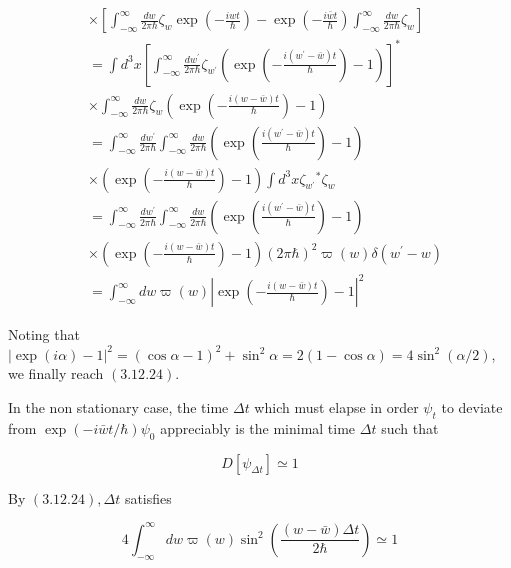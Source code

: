 \documentclass{article}
\begin{document}
 
\begin{align*}
& \times\left[\int_{-\infty}^{\infty} \frac{d w}{2 \pi \hbar} \zeta_{w} \exp \left(-\frac{i w t}{\hbar}\right)-\exp \left(-\frac{i \bar{w} t}{\hbar}\right) \int_{-\infty}^{\infty} \frac{d w}{2 \pi \hbar} \zeta_{w}\right] \\
& =\int d^{3} x\left[\int_{-\infty}^{\infty} \frac{d w^{\prime}}{2 \pi \hbar} \zeta_{w^{\prime}}\left(\exp \left(-\frac{i\left(w^{\prime}-\bar{w}\right) t}{\hbar}\right)-1\right)\right]^{*}  \tag{3.12.25}\\
& \times \int_{-\infty}^{\infty} \frac{d w}{2 \pi \hbar} \zeta_{w}\left(\exp \left(-\frac{i(w-\bar{w}) t}{\hbar}\right)-1\right) \\
& =\int_{-\infty}^{\infty} \frac{d w^{\prime}}{2 \pi \hbar} \int_{-\infty}^{\infty} \frac{d w}{2 \pi \hbar}\left(\exp \left(\frac{i\left(w^{\prime}-\bar{w}\right) t}{\hbar}\right)-1\right) \\
& \times\left(\exp \left(-\frac{i(w-\bar{w}) t}{\hbar}\right)-1\right) \int d^{3} x \zeta_{w^{\prime}}{ }^{*} \zeta_{w} \\
& =\int_{-\infty}^{\infty} \frac{d w^{\prime}}{2 \pi \hbar} \int_{-\infty}^{\infty} \frac{d w}{2 \pi \hbar}\left(\exp \left(\frac{i\left(w^{\prime}-\bar{w}\right) t}{\hbar}\right)-1\right) \\
& \times\left(\exp \left(-\frac{i(w-\bar{w}) t}{\hbar}\right)-1\right)(2 \pi \hbar)^{2} \varpi(w) \delta\left(w^{\prime}-w\right) \\
& =\int_{-\infty}^{\infty} d w \varpi(w)\left|\exp \left(-\frac{i(w-\bar{w}) t}{\hbar}\right)-1\right|^{2}
\end{align*}
 

Noting that $|\exp (i \alpha)-1|^{2}=(\cos \alpha-1)^{2}+\sin ^{2} \alpha=2(1-\cos \alpha)=4 \sin ^{2}(\alpha / 2)$, we finally reach $(3.12 .24)$.

In the non stationary case, the time $\Delta t$ which must elapse in order $\psi_{t}$ to deviate from $\exp (-i \bar{w} t / \hbar) \psi_{0}$ appreciably is the minimal time $\Delta t$ such that
 
\begin{equation*}
D\left[\psi_{\Delta t}\right] \simeq 1 \tag{3.12.26}
\end{equation*}
 

By $(3.12 .24), \Delta t$ satisfies
 
\begin{equation*}
4 \int_{-\infty}^{\infty} d w \varpi(w) \sin ^{2}\left(\frac{(w-\bar{w}) \Delta t}{2 \hbar}\right) \simeq 1 \tag{3.12.27}
\end{equation*}
 
\end{document}
